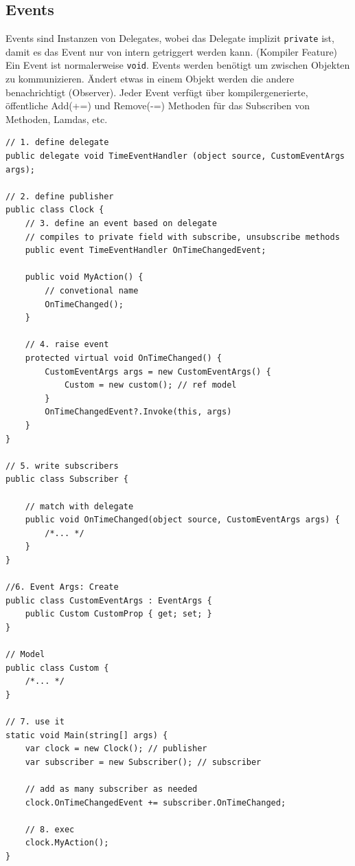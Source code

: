\documentclass[
a4paper,
oneside,
10pt,
fleqn,
headsepline,
toc=listofnumbered, 
bibliography=totocnumbered]{scrartcl}
\begin{document}
\subsection{Events}
Events sind Instanzen von Delegates, wobei das Delegate  implizit \lstinline|private| ist, damit es das Event nur von intern getriggert werden kann. (Kompiler Feature) Ein Event ist normalerweise \lstinline|void|. Events werden benötigt um zwischen Objekten zu kommunizieren. Ändert etwas in einem Objekt werden die andere benachrichtigt (Observer). Jeder Event verfügt über kompilergenerierte, öffentliche Add(+=) und Remove(-=) Methoden für das Subscriben von Methoden, Lamdas, etc.
\begin{lstlisting}
// 1. define delegate
public delegate void TimeEventHandler (object source, CustomEventArgs args);

// 2. define publisher
public class Clock {
	// 3. define an event based on delegate
	// compiles to private field with subscribe, unsubscribe methods
	public event TimeEventHandler OnTimeChangedEvent;
	
	public void MyAction() {
		// convetional name
		OnTimeChanged();
	}
	
	// 4. raise event
	protected virtual void OnTimeChanged() {
		CustomEventArgs args = new CustomEventArgs() {
			Custom = new custom(); // ref model
		}
		OnTimeChangedEvent?.Invoke(this, args)
	}
}

// 5. write subscribers
public class Subscriber {
	
	// match with delegate
	public void OnTimeChanged(object source, CustomEventArgs args) {
		/*... */ 
	}
}

//6. Event Args: Create 
public class CustomEventArgs : EventArgs {
	public Custom CustomProp { get; set; }
}

// Model
public class Custom {
	/*... */ 
}

// 7. use it
static void Main(string[] args) {
	var clock = new Clock(); // publisher
	var subscriber = new Subscriber(); // subscriber
	
	// add as many subscriber as needed
	clock.OnTimeChangedEvent += subscriber.OnTimeChanged;
	
	// 8. exec
	clock.MyAction();
}
\end{lstlisting}
\end{document}
